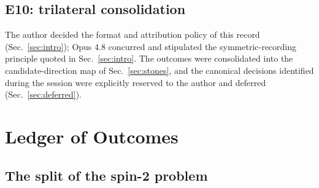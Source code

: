 \documentclass[%
 reprint, amsmath,amssymb, aps, prb, ]{revtex4-2}
\numberwithin{equation}{section}
\begin{document}
\subsection{E10: trilateral consolidation}

The author decided the format and attribution policy of this record (Sec.~\ref{sec:intro}); Opus 4.8 concurred and stipulated the symmetric-recording principle quoted in Sec.~\ref{sec:intro}. The outcomes were consolidated into the candidate-direction map of Sec.~\ref{sec:stones}, and the canonical decisions identified during the session were explicitly reserved to the author and deferred (Sec.~\ref{sec:deferred}).

\section{Ledger of Outcomes}
\label{sec:ledger}

\subsection{The split of the spin-2 problem}
\label{sec:split}
\end{document}
